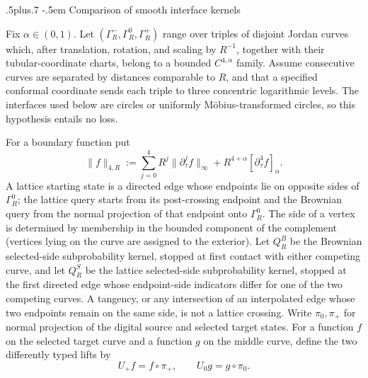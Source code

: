 \documentclass[12pt,reqno]{amsart}
\makeatletter
\def\subsection{\@startsection{subsection}{2}{0pt}%
  {.5\linespacing plus.7\linespacing}
  {-.5em}
  {\normalfont\scshape}}
\theoremstyle{plain}
\theoremstyle{definition}
\theoremstyle{remark}
\numberwithin{equation}{section}
\makeatother
\begin{document}
\subsection{Comparison of smooth interface kernels}

Fix $\alpha\in(0,1)$.  Let
$(\Gamma_R^-,\Gamma_R^0,\Gamma_R^+)$ range over triples of
disjoint Jordan curves which, after translation, rotation, and scaling
by $R^{-1}$, together with their tubular-coordinate charts, belong to
a bounded $C^{4,\alpha}$ family.  Assume consecutive curves are
separated by distances comparable to $R$, and that a specified
conformal coordinate sends each triple to three concentric logarithmic
levels.  The interfaces used below are circles or uniformly
Möbius-transformed circles, so this hypothesis entails no loss.

For a boundary function put
\begin{equation}
\|f\|_{4,R}:=\sum_{j=0}^4R^j\|\partial_\tau^jf\|_\infty
             +R^{4+\alpha}[\partial_\tau^4f]_\alpha .\label{eq:ct-smooth-39a}
\end{equation}
A lattice starting state is a directed edge whose endpoints lie on opposite
sides of $\Gamma_R^0$; the lattice query starts from its post-crossing
endpoint and the Brownian query from the normal projection of that endpoint
onto $\Gamma_R^0$.  The side of a vertex is determined by membership in
the bounded component of the complement (vertices lying on the curve are
assigned to the exterior).  Let $Q_R^B$ be the Brownian selected-side
subprobability kernel, stopped at first contact with either competing curve,
and let $Q_R^S$ be the lattice selected-side subprobability kernel, stopped
at the first directed edge whose endpoint-side indicators differ for one of
the two competing curves.  A tangency, or any intersection of an interpolated
edge whose two endpoints remain on the same side, is not a lattice crossing.
Write $\pi_0,\pi_+$ for normal projection of the digital source
and selected target states.  For a function $f$ on the selected target
curve and a function $g$ on the middle curve, define the two differently
typed lifts by
\[
U_+f=f\circ\pi_+,
                 \qquad U_0g=g\circ\pi_0.
\]
\end{document}
